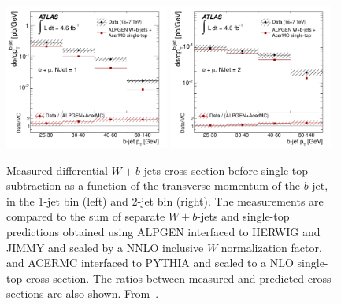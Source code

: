 \documentclass[11pt]{cernrep}
\begin{document}
\begin{figure}
\begin{center}
\includegraphics[width=0.48\textwidth]{fig_09a.pdf}
\includegraphics[width=0.48\textwidth]{fig_09b.pdf}
\caption{\label{fig:wb}
Measured differential $W+b$-jets cross-section before single-top subtraction as a function of the transverse momentum of the $b$-jet, in the 
1-jet bin (left) and 2-jet bin (right). 
The measurements are compared to the sum of separate $W+b$-jets and single-top predictions 
obtained using ALPGEN interfaced to HERWIG and JIMMY and scaled by a NNLO inclusive $W$ normalization factor, and ACERMC interfaced to PYTHIA and scaled to a 
NLO single-top cross-section. 
The ratios between measured and predicted cross-sections are also shown. From~\protect\cite{Aad:2013vka}.}
\end{center}
\end{figure}
\end{document}
